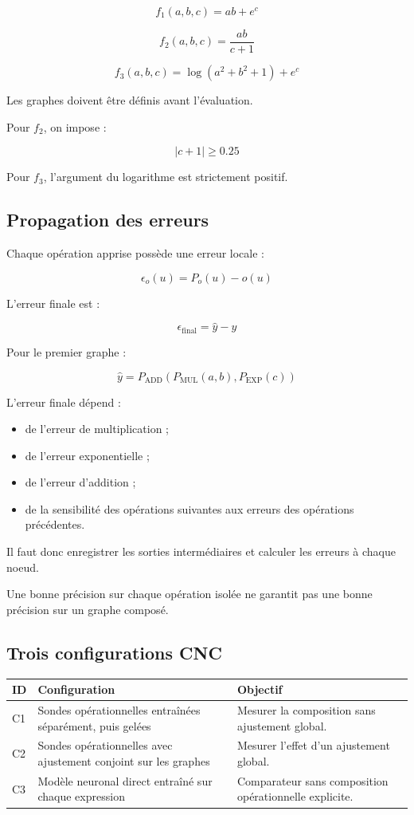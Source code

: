 \documentclass[11pt,a4paper]{article}
\begin{document}
\[
f_1(a,b,c)=ab+e^c
\]

\[
f_2(a,b,c)=\frac{ab}{c+1}
\]

\[
f_3(a,b,c)=
\log(a^2+b^2+1)+e^c
\]

Les graphes doivent être définis avant l'évaluation.

Pour $f_2$, on impose :

\[
|c+1|\geq0.25
\]

Pour $f_3$, l'argument du logarithme est strictement positif.

\subsection{Propagation des erreurs}

Chaque opération apprise possède une erreur locale :

\[
\epsilon_o(u)=P_o(u)-o(u)
\]

L'erreur finale est :

\[
\epsilon_{\mathrm{final}}
=
\widehat y-y
\]

Pour le premier graphe :

\[
\widehat y=
P_{\mathrm{ADD}}
\left(
P_{\mathrm{MUL}}(a,b),
P_{\mathrm{EXP}}(c)
\right)
\]

L'erreur finale dépend :
\begin{itemize}
    \item de l'erreur de multiplication ;
    \item de l'erreur exponentielle ;
    \item de l'erreur d'addition ;
    \item de la sensibilité des opérations suivantes
    aux erreurs des opérations précédentes.
\end{itemize}

Il faut donc enregistrer les sorties intermédiaires
et calculer les erreurs à chaque noeud.

Une bonne précision sur chaque opération isolée
ne garantit pas une bonne précision sur un graphe composé.

\subsection{Trois configurations CNC}

\begin{tabularx}{\textwidth}{
    >{\centering\arraybackslash}p{}
    >{\RaggedRight\arraybackslash}p{}
    X
}
\toprule
\textbf{ID} & \textbf{Configuration} & \textbf{Objectif} \\
\midrule
C1
& Sondes opérationnelles entraînées séparément,
puis gelées
& Mesurer la composition sans ajustement global. \\

C2
& Sondes opérationnelles avec ajustement conjoint
sur les graphes
& Mesurer l'effet d'un ajustement global. \\

C3
& Modèle neuronal direct entraîné sur chaque expression
& Comparateur sans composition opérationnelle explicite. \\
\bottomrule
\end{tabularx}
\end{document}
